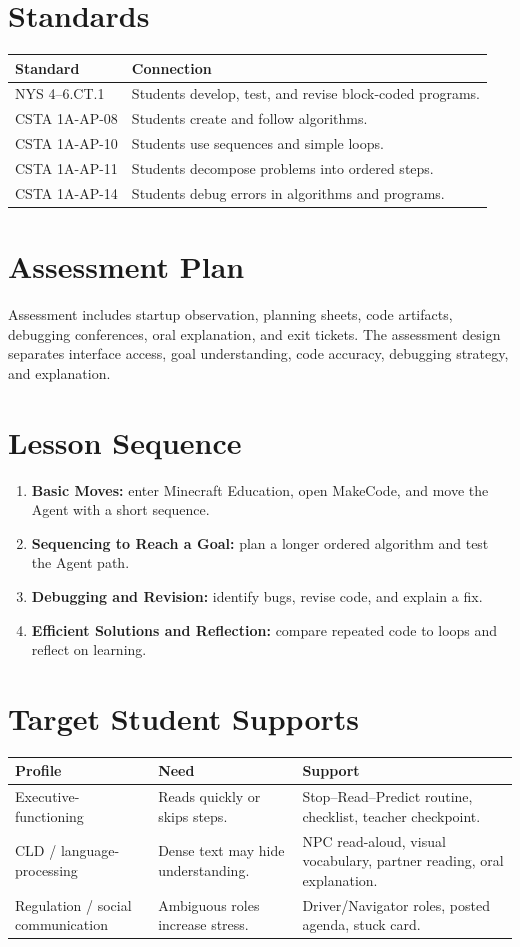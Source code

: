 \documentclass[12pt]{article}
\begin{document}
\section{Standards}
\begin{longtable}{@{}P{1.5in}P{5.1in}@{}}
\toprule
\textbf{Standard} & \textbf{Connection} \\
\midrule
NYS 4--6.CT.1 & Students develop, test, and revise block-coded programs. \\
CSTA 1A-AP-08 & Students create and follow algorithms. \\
CSTA 1A-AP-10 & Students use sequences and simple loops. \\
CSTA 1A-AP-11 & Students decompose problems into ordered steps. \\
CSTA 1A-AP-14 & Students debug errors in algorithms and programs. \\
\bottomrule
\end{longtable}

\section{Assessment Plan}
Assessment includes startup observation, planning sheets, code artifacts, debugging conferences, oral explanation, and exit tickets. The assessment design separates interface access, goal understanding, code accuracy, debugging strategy, and explanation.

\section{Lesson Sequence}
\begin{enumerate}
\item \textbf{Basic Moves:} enter Minecraft Education, open MakeCode, and move the Agent with a short sequence.
\item \textbf{Sequencing to Reach a Goal:} plan a longer ordered algorithm and test the Agent path.
\item \textbf{Debugging and Revision:} identify bugs, revise code, and explain a fix.
\item \textbf{Efficient Solutions and Reflection:} compare repeated code to loops and reflect on learning.
\end{enumerate}

\section{Target Student Supports}
\begin{longtable}{@{}P{1.6in}P{2.1in}P{2.8in}@{}}
\toprule
\textbf{Profile} & \textbf{Need} & \textbf{Support} \\
\midrule
Executive-functioning & Reads quickly or skips steps. & Stop--Read--Predict routine, checklist, teacher checkpoint. \\
CLD / language-processing & Dense text may hide understanding. & NPC read-aloud, visual vocabulary, partner reading, oral explanation. \\
Regulation / social communication & Ambiguous roles increase stress. & Driver/Navigator roles, posted agenda, stuck card. \\
\bottomrule
\end{longtable}
\end{document}
